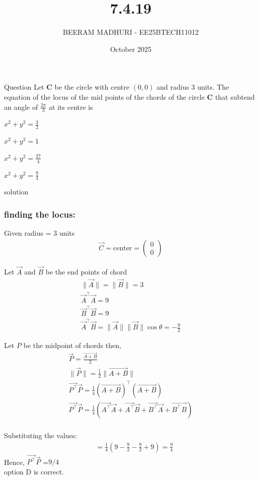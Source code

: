 \documentclass{beamer}
\title %
{7.4.19}
\date{October  2025}
\author %
{BEERAM MADHURI - EE25BTECH11012}
\begin{document}
\frame{\titlepage}
\begin{frame}{Question}
Let $\mathbf{C}$ be the circle with centre $(0,0)$ and radius $3$ units. The equation of the locus of the mid points of the chords of the circle $\mathbf{C}$ that subtend an angle of $\frac{2\pi}{3}$ at its centre is

\begin{enumerate}
\begin{multicols}{4}
    \item $x^2 + y^2 = \frac{3}{2}$
    \item $x^2 + y^2 = 1$
    \item $x^2 + y^2 = \frac{27}{4}$
    \item $x^2 + y^2 = \frac{9}{4}$
\end{multicols}    
\end{enumerate}
\end{frame}
 
\begin{frame}{solution}
\frametitle{finding the locus:}
Given radius = $3$ units
\begin{align}
\vec{C} = \text{center} = \begin{pmatrix} 0 \\ 0 \end{pmatrix}
\end{align}

Let $\vec{A}$ and $\vec{B}$ be the end points of chord 
\begin{align}
\|\vec{A}\| = \|\vec{B}\| = 3 \\
\vec{A}^\top \vec{A} = 9 \\
\vec{B}^\top \vec{B} = 9 \\
\vec{A}^\top \vec{B} = \|\vec{A}\| \|\vec{B}\| \cos\theta = -\frac{9}{2} 
\end{align}
\end{frame}
\begin{frame}
Let $P$ be the midpoint of chords then, 
\begin{align}
\vec{P} = \frac{\vec{A + B}}{2} \\
\|\vec{P}\| = \frac{1}{2} \|\vec{A + B}\| \\
\vec{P^\top} \vec{P} = \frac{1}{4} (\vec{A+B})^\top (\vec{A+B}) \\
\vec{P^\top} \vec{P} = \frac{1}{4} (\vec{A^\top} \vec{A} + \vec{A^\top} \vec{B} + \vec{B^\top} \vec{A} + \vec{B^\top B})\\
\end{align}
\end{frame}
\begin{frame}
Substituting the values:
\begin{align}
\quad = \frac{1}{4} \left(9 - \frac{9}{2} - \frac{9}{2} + 9\right) = \frac{9}{4}
\end{align}
Hence, $\vec{P^\top} \vec{P}$ =${9}/{4}$\\
option {D} is correct.
\end{frame}
\end{document}
